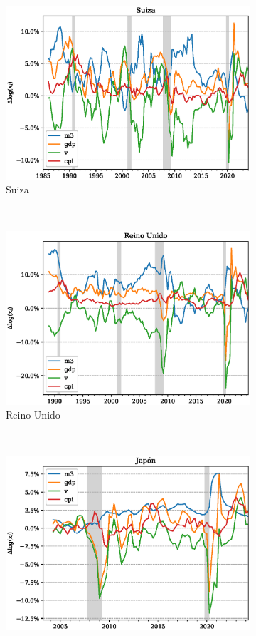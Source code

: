 \documentclass[titlepage, 12pt]{article}
\begin{document}
\begin{figure}
\begin{subfigure}[b]{0.49\textwidth}
        \includegraphics[width=\textwidth]{plots/ch-magnitudes.eps}
        \caption{Suiza}
    \end{subfigure}
    ~
    \begin{subfigure}[b]{0.49\textwidth}
        \includegraphics[width=\textwidth]{plots/uk-magnitudes.eps}
        \caption{Reino Unido}
    \end{subfigure}
    ~
    \begin{subfigure}[b]{0.49\textwidth}
        \includegraphics[width=\textwidth]{plots/jp-magnitudes.eps}

\end{subfigure}
\end{figure}
\end{document}

